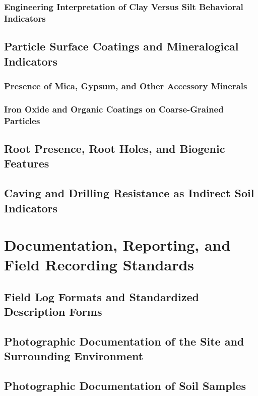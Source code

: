 \subsubsection{Engineering Interpretation of Clay Versus Silt Behavioral Indicators}

\subsection{Particle Surface Coatings and Mineralogical Indicators}

\subsubsection{Presence of Mica, Gypsum, and Other Accessory Minerals}

\subsubsection{Iron Oxide and Organic Coatings on Coarse-Grained Particles}

\subsection{Root Presence, Root Holes, and Biogenic Features}

\subsection{Caving and Drilling Resistance as Indirect Soil Indicators}

\section{Documentation, Reporting, and Field Recording Standards}

\subsection{Field Log Formats and Standardized Description Forms}

\subsection{Photographic Documentation of the Site and Surrounding Environment}

\subsection{Photographic Documentation of Soil Samples}


